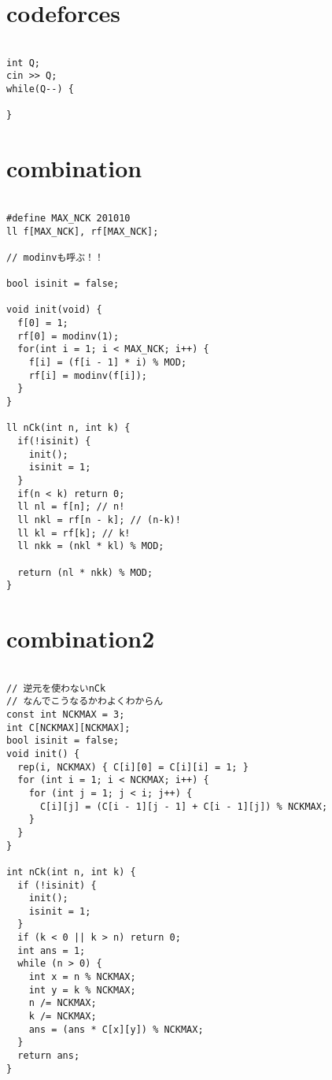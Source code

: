 \documentclass{jsarticle}
\begin{document}
\color{white}
\section{codeforces}
\color{black}
\begin{lstlisting}[caption=codeforces]

int Q;
cin >> Q;
while(Q--) {
  
}

\end{lstlisting}

\color{white}
\section{combination}
\color{black}
\begin{lstlisting}[caption=combination]

#define MAX_NCK 201010
ll f[MAX_NCK], rf[MAX_NCK];

// modinvも呼ぶ！！

bool isinit = false;

void init(void) {
  f[0] = 1;
  rf[0] = modinv(1);
  for(int i = 1; i < MAX_NCK; i++) {
    f[i] = (f[i - 1] * i) % MOD;
    rf[i] = modinv(f[i]);
  }
}

ll nCk(int n, int k) {
  if(!isinit) {
    init();
    isinit = 1;
  }
  if(n < k) return 0;
  ll nl = f[n]; // n!
  ll nkl = rf[n - k]; // (n-k)!
  ll kl = rf[k]; // k!
  ll nkk = (nkl * kl) % MOD;

  return (nl * nkk) % MOD;
}

\end{lstlisting}

\color{white}
\section{combination2}
\color{black}
\begin{lstlisting}[caption=combination2]

// 逆元を使わないnCk
// なんでこうなるかわよくわからん
const int NCKMAX = 3;
int C[NCKMAX][NCKMAX];
bool isinit = false;
void init() {
  rep(i, NCKMAX) { C[i][0] = C[i][i] = 1; }
  for (int i = 1; i < NCKMAX; i++) {
    for (int j = 1; j < i; j++) {
      C[i][j] = (C[i - 1][j - 1] + C[i - 1][j]) % NCKMAX;
    }
  }
}

int nCk(int n, int k) {
  if (!isinit) {
    init();
    isinit = 1;
  }
  if (k < 0 || k > n) return 0;
  int ans = 1;
  while (n > 0) {
    int x = n % NCKMAX;
    int y = k % NCKMAX;
    n /= NCKMAX;
    k /= NCKMAX;
    ans = (ans * C[x][y]) % NCKMAX;
  }
  return ans;
}

\end{lstlisting}
\end{document}
